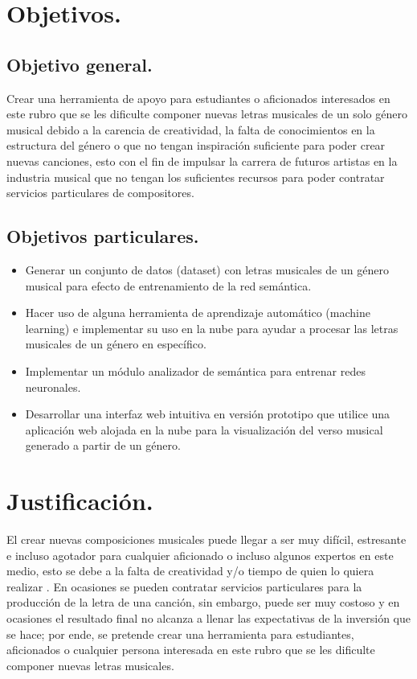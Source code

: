 \documentclass[12pt, a4paper, titlepage]{report}
\begin{document}
\section{Objetivos.}
	\subsection{Objetivo general.}
	Crear una herramienta de apoyo para estudiantes o aficionados interesados en este rubro que se les dificulte componer nuevas letras musicales de un solo género musical debido a la carencia de creatividad, la falta de conocimientos en la estructura del género o que no tengan inspiración suficiente para poder crear nuevas canciones, esto con el fin de impulsar la carrera de futuros artistas en la industria musical que no tengan los suficientes recursos para poder contratar servicios particulares de compositores.
	
	\subsection{Objetivos particulares.}
		\begin{itemize}
			\item Generar un conjunto de datos (dataset) con letras musicales de un género musical para efecto de entrenamiento de la red semántica.
    		\item Hacer uso de alguna herramienta de aprendizaje automático (machine learning) e implementar su uso en la nube para ayudar a procesar las letras musicales de un género en específico.
    		\item Implementar un módulo analizador de semántica para entrenar redes neuronales.
    		\item Desarrollar una interfaz web intuitiva en versión prototipo que utilice una aplicación web alojada en la nube para la visualización del verso musical generado a partir de un género.
    	\end{itemize}
		
    	\section{Justificación.}
    	El crear nuevas composiciones musicales puede llegar a ser muy difícil, estresante e incluso agotador para cualquier aficionado o incluso algunos expertos en este medio, esto se debe a la falta de creatividad y/o tiempo de quien lo quiera realizar \cite{What_about_the_music}. En ocasiones se pueden contratar servicios particulares para la producción de la letra de una canción, sin embargo, puede ser muy costoso y en ocasiones el resultado final no alcanza a llenar las expectativas de la inversión que se hace; por ende, se pretende crear una herramienta para estudiantes, aficionados o cualquier persona interesada en este rubro que se les dificulte componer nuevas letras musicales.\\
    	
\end{document}
